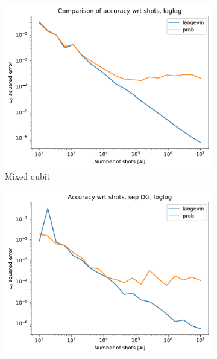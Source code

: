 \documentclass[12pt]{memoir}
\begin{document}
\begin{figure}[H]

    \centering

    \begin{subfigure}[b]{0.49\textwidth}


        \centering

        \includegraphics[width=\textwidth]{figures/experiments/shots/shots_acc_comp_shots_exp_loglog-1.png}

        \caption{Mixed qubit}

        \label{fig:shots-comp-mixed-sub}

    \end{subfigure}
    \hfill
    \begin{subfigure}[b]{0.49\textwidth}


        \centering

        \includegraphics[width=\textwidth]{figures/experiments/shots/shots_acc_comp_shots_exp_sep_loglog-1.png}


\end{subfigure}
\end{figure}
\end{document}
